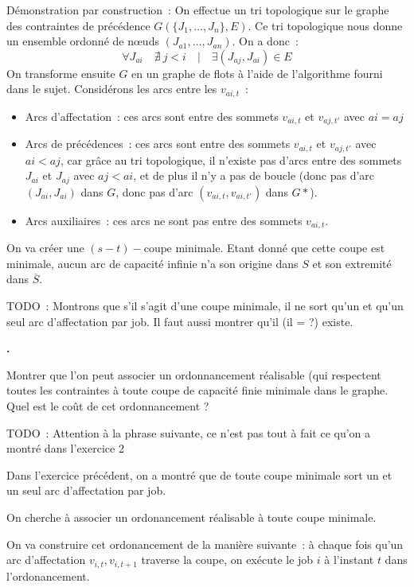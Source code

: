 \documentclass{article}
\newcounter{enoncecount}
\newenvironment{enonce}
{
\stepcounter{enoncecount}
\bf\small \arabic{enoncecount}.
\begin{bf}
}
{
\end{bf}
}
\begin{document}
Démonstration par construction~: 
On effectue un tri topologique sur le graphe des contraintes de précédence $G(\{J_1, \dots, J_n\}, E)$. Ce tri topologique nous donne un ensemble ordonné de n\oe uds $(J_{a1}, \dots, J_{an})$. On a donc~:
$$\forall J_{ai} \quad \nexists \ j < i \quad | \quad \exists (J_{aj}, J_{ai}) \in E$$
On transforme ensuite $G$ en un graphe de flots à l'aide de l'algorithme fourni dans le sujet. 
Considérons les arcs entre les $v_{ai,t}$~: 
\begin{itemize}
	\item Arcs d'affectation~: ces arcs sont entre des sommets $v_{ai,t}$ et $v_{aj,t'}$ avec $ai = aj$
	\item Arcs de précédences~: ces arcs sont entre des sommets $v_{ai,t}$ et $v_{aj,t'}$ avec $ai < aj$, car grâce au tri topologique, il n'existe pas d'arcs entre des sommets $J_{ai}$ et $J_{aj}$ avec $aj < ai$, et de plus il n'y a pas de boucle (donc pas d'arc $(J_{ai},J_{ai})$ dans $G$, donc pas d'arc $(v_{ai,t}, v_{ai,t'})$ dans $G*$).
	\item Arcs auxiliaires~: ces arcs ne sont pas entre des sommets $v_{ai,t}$.
\end{itemize}
On va créer une $(s-t)-\mathrm{coupe}$ minimale. Etant donné que cette coupe est minimale, aucun arc de capacité infinie n'a son origine dans $S$ et son extremité dans $\overline{S}$.

TODO~: Montrons que s'il s'agit d'une coupe minimale, il ne sort qu'un et qu'un
seul arc d'affectation par job. Il faut aussi montrer qu'il (il = ?) existe.

\begin{enonce}
Montrer que l'on peut associer un ordonnancement réalisable (qui respectent toutes les contraintes à toute 
coupe de capacité finie minimale dans le graphe. Quel est le coût de cet ordonnancement ? 
\end{enonce}

TODO~: Attention à la phrase suivante, ce n'est pas tout à fait ce qu'on a montré dans l'exercice 2

Dans l'exercice précédent, on a montré que de toute coupe minimale sort un et un seul arc d'affectation par job.

On cherche à associer un ordonancement réalisable à toute coupe minimale.

On va construire cet ordonancement de la manière suivante~: à chaque
fois qu'un arc d'affectation $v_{i,t}, v_{i,t+1}$ traverse la coupe,
on exécute le job $i$ à l'instant $t$ dans l'ordonancement.
\end{document}
